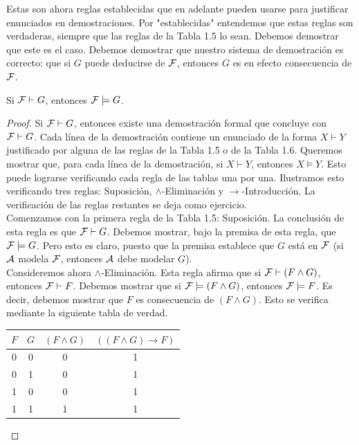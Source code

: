 \documentclass[12pt,a4paper]{book}
\newcommand{\comillas}[1]{"#1"}
\begin{document}
    Estas son ahora reglas establecidas que en adelante pueden usarse para justificar enunciados en demostraciones. Por
    \comillas{establecidas} entendemos que estas reglas son verdaderas, siempre que las reglas de la Tabla 1.5 lo sean. Debemos
    demostrar que este es el caso. Debemos demostrar que nuestro sistema de demostración es correcto: que si $G$ puede deducirse
    de $\FF$, entonces $G$ es en efecto consecuencia de $\FF$.

    \begin{teorema}[Correctud]\label{thm:correccion}
        Si $\FF\vdash G$, entonces $\FF\models G$.
    \end{teorema}
    \begin{proof}
        Si $\FF\vdash G$, entonces existe una demostración formal que concluye con $\FF\vdash G$. Cada línea de la demostración
        contiene un enunciado de la forma $X\vdash Y$ justificado por alguna de las reglas de la Tabla 1.5 o de la Tabla 1.6.
        Queremos mostrar que, para cada línea de la demostración, si $X\vdash Y$, entonces $X\models Y$. Esto puede lograrse
        verificando cada regla de las tablas una por una. Ilustramos esto verificando tres reglas: Suposición, $\wedge$-Eliminación
        y $\rightarrow$-Introducción. La verificación de las reglas restantes se deja como ejercicio.\\
        Comenzamos con la primera regla de la Tabla 1.5: Suposición. La conclusión de esta regla es que $\FF\vdash G$. Debemos
        mostrar, bajo la premisa de esta regla, que $\FF\models G$. Pero esto es claro, puesto que la premisa establece que $G$
        está en $\FF$ (si $\AA$ modela $\FF$, entonces $\AA$ debe modelar $G$).\\
        Consideremos ahora $\wedge$-Eliminación. Esta regla afirma que si $\FF\vdash(F\wedge G)$, entonces $\FF\vdash F$. Debemos
        mostrar que si $\FF\models(F\wedge G)$, entonces $\FF\models F$. Es decir, debemos mostrar que $F$ es consecuencia de
        $(F\wedge G)$. Esto se verifica mediante la siguiente tabla de verdad.

        \begin{center}
        \renewcommand{\arraystretch}{1.5}
        \begin{tabular}{c | c | c | c}
            $F$ & $G$ & $(F\wedge G)$ & $((F\wedge G)\rightarrow F)$\\
            \hline
            0 & 0 & 0 & 1\\
            0 & 1 & 0 & 1\\
            1 & 0 & 0 & 1\\
            1 & 1 & 1 & 1\\
        \end{tabular}
        \end{center}


\end{proof}
\end{document}
